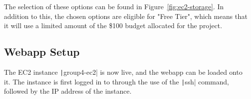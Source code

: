 The selection of these options can be found in Figure~\ref{fig:ec2-storage}.
In addition to this, the chosen options are eligible for "Free Tier", which means that it will use a limited amount of the
\$100 budget allocated for the project.


\subsection{Webapp Setup}\label{subsec:webapp-setup}

The EC2 instance \texttt|group4-ec2| is now live, and the webapp can be loaded onto it.
The instance is first logged in to through the use of the \texttt|ssh| command, followed by the IP address of
the instance.

